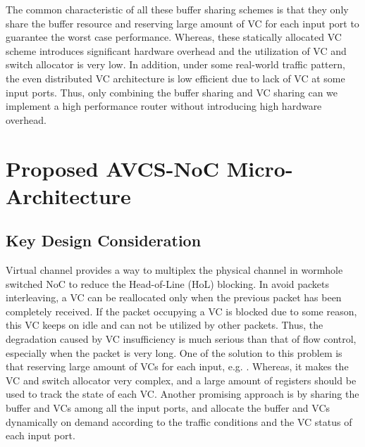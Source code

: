 \documentclass[10pt,conference]{IEEEtran}
\begin{document}
The common characteristic of all these buffer sharing schemes is that they only share the buffer resource and reserving large amount of VC for each input port to guarantee the worst case performance. Whereas, these statically allocated VC scheme introduces significant hardware overhead and the utilization of VC and switch allocator is very low. In addition, under some real-world traffic pattern, the even distributed VC architecture is low efficient due to lack of VC at some input ports. Thus, only combining the buffer sharing and VC sharing can we implement a high performance router without introducing high hardware overhead.

\section{Proposed AVCS-NoC Micro-Architecture}\label{implemented}
\subsection{Key Design Consideration}
Virtual channel provides a way to multiplex the physical channel in wormhole switched NoC to reduce the Head-of-Line (HoL) blocking. In avoid packets interleaving, a VC can be reallocated only when the previous packet has been completely received. If the packet occupying a VC is blocked due to some reason, this VC keeps on idle and can not be utilized by other packets. Thus, the degradation caused by VC insufficiency is much serious than that of flow control, especially when the packet is very long. One of the solution to this problem is that reserving large amount of VCs for each input, e.g. \cite{NPKV06}\cite{4555894}\cite{5770788}\cite{Neishaburi:2009:RAN:1531542.1531658}\cite{6310960}. Whereas, it makes the VC and switch allocator very complex, and a large amount of registers should be used to track the state of each VC. Another promising approach is by sharing the buffer and VCs among all the input ports, and allocate the buffer and VCs dynamically on demand according to the traffic conditions and the VC status of each input port.
\end{document}
